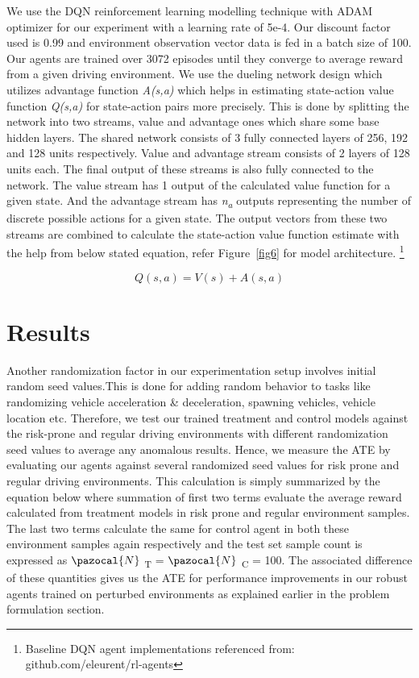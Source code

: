\documentclass[a4, conference]{IEEEtran}
\begin{document}
    We use the DQN reinforcement learning modelling technique with ADAM optimizer for our experiment with a learning rate of 5e-4. Our discount factor used is 0.99 and environment observation vector data is fed in a batch size of 100. Our agents are trained over 3072 episodes until they converge to average reward from a given driving environment. We use the dueling network design which utilizes advantage function \textit{A(s,a)} which helps in estimating state-action value function \textit{Q(s,a)} for state-action pairs more precisely. This is done by splitting the network into two streams, value and advantage ones which share some base hidden layers. The shared network consists of 3 fully connected layers of 256, 192 and 128 units respectively. Value and advantage stream consists of 2 layers of 128 units each. The final output of these streams is also fully connected to the network. The value stream has 1 output of the calculated value function for a given state. And the advantage stream has \textit{n\textsubscript{a}} outputs representing the number of discrete possible actions for a given state. The output vectors from these two streams are combined to calculate the state-action value function estimate with the help from below stated equation, refer Figure~\ref{fig6} for model architecture. \footnote{Baseline DQN agent implementations referenced from: github.com/eleurent/rl-agents}

    \begin{equation}
        Q(s, a) = V (s) + A(s, a)
    \end{equation}


\section{Results}


    Another randomization factor in our experimentation setup involves initial random seed values.This is done for adding random behavior to tasks like randomizing vehicle acceleration \& deceleration, spawning vehicles, vehicle location etc. Therefore, we test our trained treatment and control models against the risk-prone and regular driving environments with different randomization seed values to average any anomalous results. Hence, we measure the ATE by evaluating our agents against several randomized seed values for risk prone and regular driving environments. This calculation is simply summarized by the equation below where summation of first two terms evaluate the average reward calculated from treatment models in risk prone and regular environment samples. The last two terms calculate the same for control agent in both these environment samples again respectively and the test set sample count is expressed as \( \pazocal{N} \) \textsubscript{T} = \( \pazocal{N} \) \textsubscript{C} = 100. The associated difference of these quantities gives us the ATE for performance improvements in our robust agents trained on perturbed environments as explained earlier in the problem formulation section.
\end{document}
